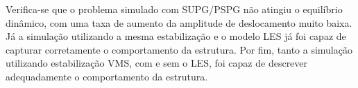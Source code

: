 Verifica-se que o problema simulado com SUPG/PSPG não atingiu o equilíbrio dinâmico, com uma taxa de aumento da amplitude de deslocamento muito baixa. Já a simulação utilizando a mesma estabilização e o modelo LES já foi capaz de capturar corretamente o comportamento da estrutura. Por fim, tanto a simulação utilizando estabilização VMS, com e sem o LES, foi capaz de descrever adequadamente o comportamento da estrutura.

